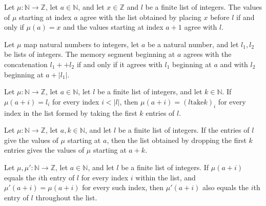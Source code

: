 \begin{theorem}
\label{Light.seg_cons}
\leanok
{}
Let $\mu:\mathbb{N}\to\mathbb{Z}$, let $a\in\mathbb{N}$, and let $x\in\mathbb{Z}$ and
$l$ be a finite list of integers. The values of $\mu$ starting at index $a$ agree with
the list obtained by placing $x$ before $l$ if and only if $\mu(a)=x$ and the values
starting at index $a+1$ agree with $l$.
\end{theorem}

\begin{theorem}
\label{Light.seg_append}
\leanok
{}
Let $\mu$ map natural numbers to integers, let $a$ be a natural number, and let
$l_1,l_2$ be lists of integers. The memory segment beginning at $a$ agrees with the
concatenation $l_1++l_2$ if and only if it agrees with $l_1$ beginning at $a$ and with
$l_2$ beginning at $a+|l_1|$.
\end{theorem}

\begin{theorem}
\label{Light.Seg.take}
\leanok
{}
Let $\mu : \mathbb{N}\to\mathbb{Z}$, let $a\in\mathbb{N}$, let $l$ be a finite list of
integers, and let $k\in\mathbb{N}$. If $\mu(a+i)=l_i$ for every index $i<|l|$, then
$\mu(a+i)=(l\mathbin{\mathrm{take}}k)_i$ for every index in the list formed by taking
the first $k$ entries of $l$.
\end{theorem}

\begin{theorem}
\label{Light.Seg.drop}
\leanok
{}
Let $\mu:\mathbb{N}\to\mathbb{Z}$, let $a,k\in\mathbb{N}$, and let $l$ be a finite list
of integers. If the entries of $l$ give the values of $\mu$ starting at $a$, then the
list obtained by dropping the first $k$ entries gives the values of $\mu$ starting at
$a+k$.
\end{theorem}

\begin{theorem}
\label{Light.Seg.congr}
\leanok
{}
Let $\mu,\mu':\mathbb{N}\to\mathbb{Z}$, let $a\in\mathbb{N}$, and let $l$ be a finite
list of integers. If $\mu(a+i)$ equals the $i$th entry of $l$ for every index $i$ within
the list, and $\mu'(a+i)=\mu(a+i)$ for every such index, then $\mu'(a+i)$ also equals
the $i$th entry of $l$ throughout the list.
\end{theorem}

